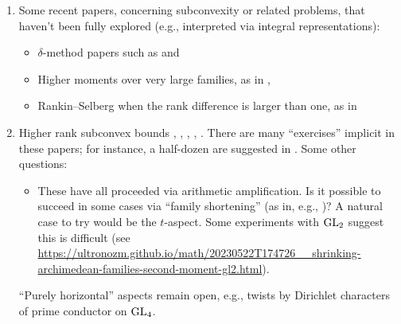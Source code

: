 \documentclass[reqno]{amsart} 
\begin{document}
\begin{enumerate}
\item Some recent papers, concerning subconvexity or related problems, that haven't been fully explored (e.g., interpreted via integral representations):
  \begin{itemize}
  \item $\delta$-method papers such as \cite{MR4416133} and \cite{2022arXiv2206.06517}
  \item Higher moments over very large families, as in \cite{MR4216694}, \cite{MR4067357}
  \item Rankin--Selberg when the rank difference is larger than one, as in \cite{MR3996341}
  \end{itemize}

\item Higher rank subconvex bounds \cite{MR4203038}, \cite{2023arXiv2309.16667}, \cite{2020arXiv201202187N}, \cite{2021arXiv210915230N}, \cite{2023arXiv2309.06314}.  There are many ``exercises'' implicit in these papers; for instance, a half-dozen are suggested in \cite[Remark 1.4]{2020arXiv201202187N}.  Some other questions:
  \begin{itemize}
  \item These have all proceeded via arithmetic amplification.  Is it possible to succeed in some cases via ``family shortening'' (as in, e.g., \cite{Sar01})?  A natural case to try would be the $t$-aspect.  Some experiments with $\operatorname{GL}_2$ suggest this is difficult (see \url{https://ultronozm.github.io/math/20230522T174726__shrinking-archimedean-families-second-moment-gl2.html}).
  \end{itemize} ``Purely horizontal'' aspects remain open, e.g., twists by Dirichlet characters of prime conductor on $\operatorname{GL}_4$.
\end{enumerate}


{} 
\end{document}
